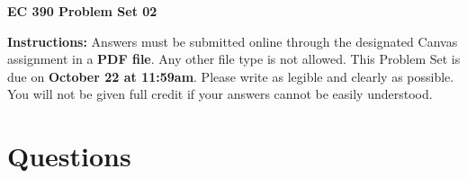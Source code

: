 \documentclass[12pt]{exam}
\newcommand{\examdate}{\fontfamily{lmss} \textbf{October 22 at 11:59am}}
\begin{document}
\selectfont

\begin{center}
    \textbf{{\LARGE EC 390 Problem Set 02}} \\
    \smallskip 
\end{center}

\noindent \textbf{Instructions:} 
Answers must be submitted online through the designated Canvas assignment in a \textbf{PDF file}.
Any other file type is not allowed. 
This Problem Set is due on \examdate.
Please write as legible and clearly as possible. 
You will not be given full credit if your answers cannot be easily understood. 

\section*{Questions}
\end{document}
